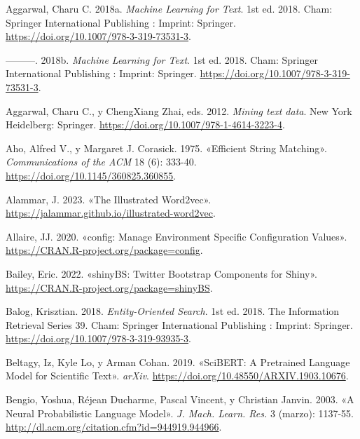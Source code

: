 \documentclass[
  12pt,
  openany]{book}
\newlength{\cslhangindent}
\newlength{\cslentryspacingunit} %
\newenvironment{CSLReferences}[2] %
 {%
  \setlength{\parindent}{0pt}
  \ifodd #1
  \let\oldpar\par
  \def\par{\hangindent=\cslhangindent\oldpar}
  \fi
  \setlength{\parskip}{#2\cslentryspacingunit}
 }%
 {}
\begin{document}
\hypertarget{refs}{}
\begin{CSLReferences}{1}{0}
\leavevmode{}%
Aggarwal, Charu C. 2018a. \emph{Machine Learning for Text}. 1st ed. 2018. Cham: Springer International Publishing : Imprint: Springer. \url{https://doi.org/10.1007/978-3-319-73531-3}.

\leavevmode{}%
---------. 2018b. \emph{Machine Learning for Text}. 1st ed. 2018. Cham: Springer International Publishing : Imprint: Springer. \url{https://doi.org/10.1007/978-3-319-73531-3}.

\leavevmode{}%
Aggarwal, Charu C., y ChengXiang Zhai, eds. 2012. \emph{Mining text data}. New York Heidelberg: Springer. \url{https://doi.org/10.1007/978-1-4614-3223-4}.

\leavevmode{}%
Aho, Alfred V., y Margaret J. Corasick. 1975. {«Efficient String Matching»}. \emph{Communications of the ACM} 18 (6): 333-40. \url{https://doi.org/10.1145/360825.360855}.

\leavevmode{}%
Alammar, J. 2023. {«The Illustrated Word2vec»}. \url{https://jalammar.github.io/illustrated-word2vec}.

\leavevmode{}%
Allaire, JJ. 2020. {«config: Manage Environment Specific Configuration Values»}. \url{https://CRAN.R-project.org/package=config}.

\leavevmode{}%
Bailey, Eric. 2022. {«shinyBS: Twitter Bootstrap Components for Shiny»}. \url{https://CRAN.R-project.org/package=shinyBS}.

\leavevmode{}%
Balog, Krisztian. 2018. \emph{Entity-Oriented Search}. 1st ed. 2018. The Information Retrieval Series 39. Cham: Springer International Publishing : Imprint: Springer. \url{https://doi.org/10.1007/978-3-319-93935-3}.

\leavevmode{}%
Beltagy, Iz, Kyle Lo, y Arman Cohan. 2019. {«SciBERT: A Pretrained Language Model for Scientific Text»}. \emph{arXiv}. \url{https://doi.org/10.48550/ARXIV.1903.10676}.

\leavevmode{}%
Bengio, Yoshua, Réjean Ducharme, Pascal Vincent, y Christian Janvin. 2003. {«A Neural Probabilistic Language Model»}. \emph{J. Mach. Learn. Res.} 3 (marzo): 1137-55. \url{http://dl.acm.org/citation.cfm?id=944919.944966}.


\end{CSLReferences}
\end{document}
